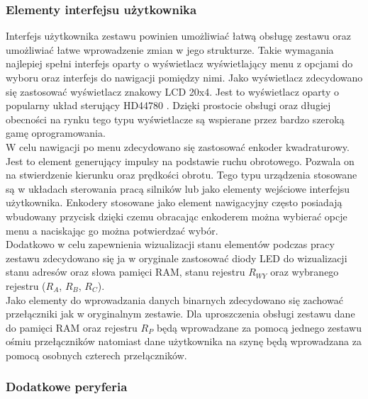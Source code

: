 \documentclass[../main.tex]{subfiles}
\begin{document}
    \subsubsection{Elementy interfejsu użytkownika}

    Interfejs użytkownika zestawu powinien umożliwiać łatwą obsługę zestawu oraz umożliwiać łatwe wprowadzenie zmian w jego strukturze. Takie wymagania
    najlepiej spełni interfejs oparty o wyświetlacz wyświetlający menu z opcjami do wyboru oraz interfejs do nawigacji pomiędzy nimi. 
    Jako wyświetlacz zdecydowano się zastosować wyświetlacz znakowy LCD 20x4. Jest to wyświetlacz oparty o popularny układ sterujący HD44780 \cite{lcd_hd44780}.
    Dzięki prostocie obsługi oraz długiej obecności na rynku tego typu wyświetlacze są wspierane przez bardzo szeroką gamę oprogramowania.
    \\
    W celu nawigacji po menu zdecydowano się zastosować enkoder kwadraturowy. Jest to element generujący impulsy na podstawie ruchu obrotowego.
    Pozwala on na stwierdzenie kierunku oraz prędkości obrotu. Tego typu urządzenia stosowane są w układach sterowania pracą silników lub jako elementy
    wejściowe interfejsu użytkownika. Enkodery stosowane jako element nawigacyjny często posiadają wbudowany przycisk \cite{encoder} dzięki czemu obracając
    enkoderem można wybierać opcje menu a naciskając go można potwierdzać wybór.
    \\
    Dodatkowo w celu zapewnienia wizualizacji stanu elementów podczas pracy zestawu zdecydowano się ja w oryginale zastosować diody LED do 
    wizualizacji stanu adresów oraz słowa pamięci RAM, stanu rejestru $R_{WY}$ oraz wybranego rejestru ($R_A$, $R_B$, $R_C$).
    \\
    Jako elementy do wprowadzania danych binarnych zdecydowano się zachować przełączniki jak w oryginalnym zestawie. Dla uproszczenia obsługi zestawu
    dane do pamięci RAM oraz rejestru $R_P$ będą wprowadzane za pomocą jednego zestawu ośmiu przełączników natomiast dane użytkownika
    na szynę będą wprowadzana za pomocą osobnych czterech przełączników.

    \subsubsection{Dodatkowe peryferia}
\end{document}
